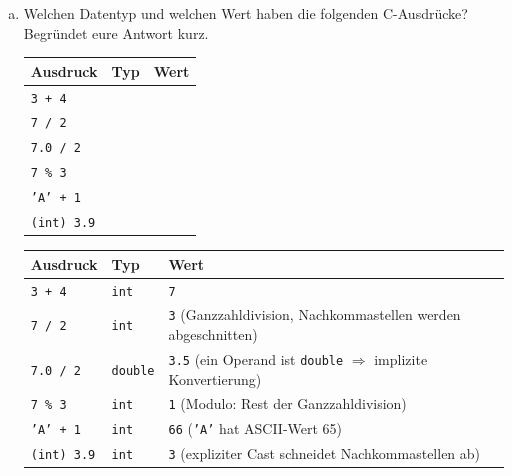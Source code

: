 
\begin{enumerate}[a)]

\item Welchen Datentyp und welchen Wert haben die folgenden C-Ausdrücke?
Begründet eure Antwort kurz.

\begin{center}
\begin{tabular}{lll}
\hline
\textbf{Ausdruck} & \textbf{Typ} & \textbf{Wert} \\
\hline
\texttt{3 + 4}      & \quad & \quad \\[0.3em]
\texttt{7 / 2}      & \quad & \quad \\[0.3em]
\texttt{7.0 / 2}    & \quad & \quad \\[0.3em]
\texttt{7 \% 3}     & \quad & \quad \\[0.3em]
\texttt{'A' + 1}    & \quad & \quad \\[0.3em]
\texttt{(int) 3.9}  & \quad & \quad \\[0.3em]
\hline
\end{tabular}
\end{center}

\begin{loesung}
\begin{center}
\begin{tabular}{lll}
\hline
\textbf{Ausdruck} & \textbf{Typ} & \textbf{Wert} \\
\hline
\texttt{3 + 4}      & \texttt{int}    & \texttt{7}   \\[0.3em]
\texttt{7 / 2}      & \texttt{int}    & \texttt{3} \quad (Ganzzahldivision, Nachkommastellen werden abgeschnitten) \\[0.3em]
\texttt{7.0 / 2}    & \texttt{double} & \texttt{3.5} \quad (ein Operand ist \texttt{double} $\Rightarrow$ implizite Konvertierung) \\[0.3em]
\texttt{7 \% 3}     & \texttt{int}    & \texttt{1} \quad (Modulo: Rest der Ganzzahldivision) \\[0.3em]
\texttt{'A' + 1}    & \texttt{int}    & \texttt{66} \quad (\texttt{'A'} hat ASCII-Wert 65) \\[0.3em]
\texttt{(int) 3.9}  & \texttt{int}    & \texttt{3} \quad (expliziter Cast schneidet Nachkommastellen ab) \\[0.3em]
\hline
\end{tabular}
\end{center}
\end{loesung}


\end{enumerate}
